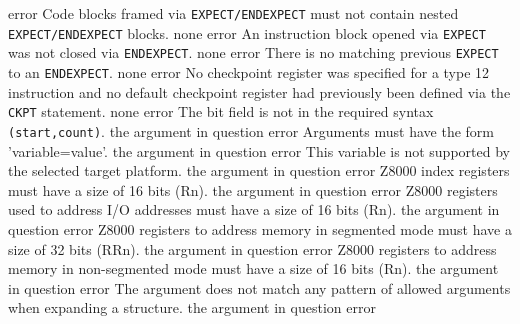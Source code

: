 \documentclass[12pt,twoside]{report}
\begin{document}
\begin{description}
               {error}
               {Code blocks framed via {\tt EXPECT/ENDEXPECT} must not contain
                nested {\tt EXPECT/ENDEXPECT} blocks.}
               {none}
               {error}
               {An instruction block opened via {\tt EXPECT} was not closed via
                {\tt ENDEXPECT}.}
               {none}
               {error}
               {There is no matching previous {\tt EXPECT} to an {\tt ENDEXPECT}.}
               {none}
               {error}
               {No checkpoint register was specified for a type 12 instruction
                and no default checkpoint register had previously been defined
                via the {\tt CKPT} statement.}
               {none}
               {error}
               {The bit field is not in the required syntax {\tt (start,count)}.}
               {the argument in question}
               {error}
               {Arguments must have the form 'variable=value'.}
               {the argument in question}
               {error}
               {This variable is not supported by the selected target platform.}
               {the argument in question}
               {error}
               {Z8000 index registers must have a size of 16 bits (Rn).}
               {the argument in question}
               {error}
               {Z8000 registers used to address I/O addresses must have a size of 16 bits (Rn).}
               {the argument in question}
               {error}
               {Z8000 registers to address memory in segmented mode must have a size of 32 bits (RRn).}
               {the argument in question}
               {error}
               {Z8000 registers to address memory in non-segmented mode must have a size of 16 bits (Rn).}
               {the argument in question}
               {error}
               {The argument does not match any pattern of allowed arguments
                when expanding a structure.}
               {the argument in question}
               {error}

\end{description}
\end{document}
